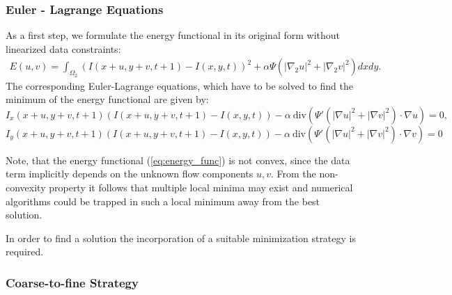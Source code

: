 \subsubsection{Euler - Lagrange Equations}

As a first step, we formulate the energy functional in its original form  without linearized data constraints:
\begin{eqnarray}
E(u,v) = \int_{\Omega_{2}} {(I(x+u, y+v, t+1) - I(x, y, t))^2 + \alpha \Psi(|\nabla_{2}u|^2 + |\nabla_{2}v|^2) dx dy}.
\label{eq:energy_func}	
\end{eqnarray}
The corresponding Euler-Lagrange equations, which have to be solved to find the minimum of the energy functional are given by:
$$ I_{x}(x+u, y+v, t+1) (I(x+u, y+v, t+1) - I(x, y, t)) - \alpha \: \textrm{div} (\Psi'(|\nabla u|^2 + |\nabla v|^2) \cdot \nabla u ) = 0,   $$
$$ I_{y}(x+u, y+v, t+1) (I(x+u, y+v, t+1) - I(x, y, t)) - \alpha \: \textrm{div} (\Psi'(|\nabla u|^2 + |\nabla v|^2) \cdot \nabla v ) = 0   $$

Note, that the energy functional (\ref{eq:energy_func}) is not convex, since the data term implicitly depends on the unknown flow components $u, v$. From the non-convexity property it follows that multiple local minima may exist and numerical algorithms could be trapped in such a local minimum away from the best solution.

In order to find a solution the incorporation of a suitable minimization strategy is required.


\subsubsection{Coarse-to-fine Strategy}
\label{coarse_strategy}


